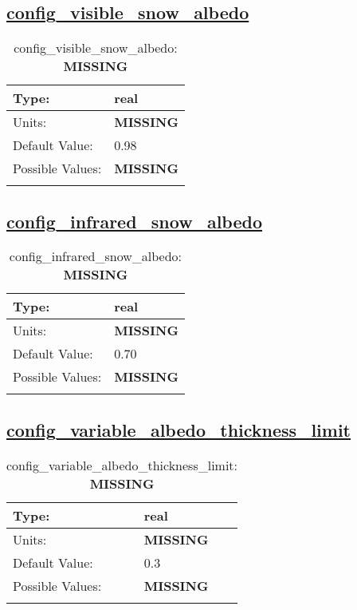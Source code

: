\subsection[config\_visible\_snow\_albedo]{\hyperref[sec:nm_tab_shortwave]{config\_visible\_snow\_albedo}}
\label{subsec:nm_sec_config_visible_snow_albedo}
\begin{center}
\begin{longtable}{| p{2.0in} || p{4.0in} |}
    \hline
    Type: & real \\
    \hline
    Units: & {\bf \color{red} MISSING} \\
    \hline
    Default Value: & 0.98 \\
    \hline
    Possible Values: & {\bf \color{red} MISSING} \\
    \hline
    \caption{config\_visible\_snow\_albedo: {\bf \color{red} MISSING}}
\end{longtable}
\end{center}
\subsection[config\_infrared\_snow\_albedo]{\hyperref[sec:nm_tab_shortwave]{config\_infrared\_snow\_albedo}}
\label{subsec:nm_sec_config_infrared_snow_albedo}
\begin{center}
\begin{longtable}{| p{2.0in} || p{4.0in} |}
    \hline
    Type: & real \\
    \hline
    Units: & {\bf \color{red} MISSING} \\
    \hline
    Default Value: & 0.70 \\
    \hline
    Possible Values: & {\bf \color{red} MISSING} \\
    \hline
    \caption{config\_infrared\_snow\_albedo: {\bf \color{red} MISSING}}
\end{longtable}
\end{center}
\subsection[config\_variable\_albedo\_thickness\_limit]{\hyperref[sec:nm_tab_shortwave]{config\_variable\_albedo\_thickness\_limit}}
\label{subsec:nm_sec_config_variable_albedo_thickness_limit}
\begin{center}
\begin{longtable}{| p{2.0in} || p{4.0in} |}
    \hline
    Type: & real \\
    \hline
    Units: & {\bf \color{red} MISSING} \\
    \hline
    Default Value: & 0.3 \\
    \hline
    Possible Values: & {\bf \color{red} MISSING} \\
    \hline
    \caption{config\_variable\_albedo\_thickness\_limit: {\bf \color{red} MISSING}}
\end{longtable}
\end{center}
